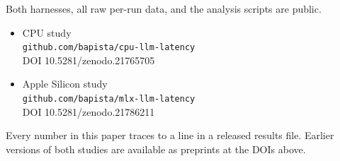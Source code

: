 \documentclass[sigconf,nonacm,10pt]{acmart}
\begin{document}
Both harnesses, all raw per-run data, and the analysis scripts are public.

\begin{itemize}\itemsep2pt
  \item CPU study\\
        \texttt{\small github.com/bapista/cpu-llm-latency}\\
        DOI 10.5281/zenodo.21765705
  \item Apple Silicon study\\
        \texttt{\small github.com/bapista/mlx-llm-latency}\\
        DOI 10.5281/zenodo.21786211
\end{itemize}

Every number in this paper traces to a line in a released results file. Earlier versions of both studies are
available as preprints at the DOIs above.



\end{document}
